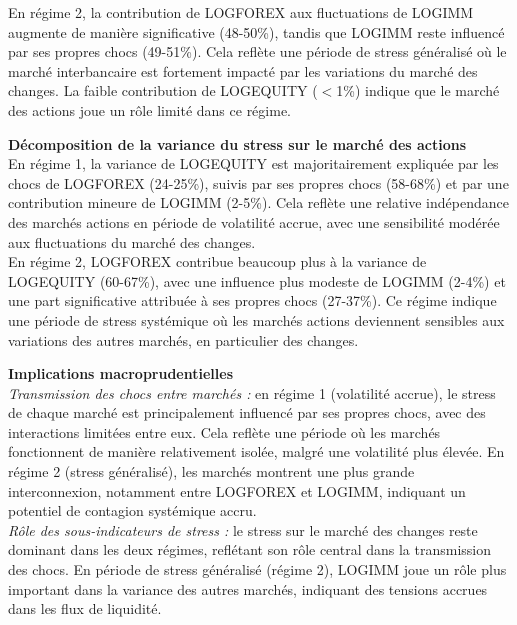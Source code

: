 En régime 2, la contribution de LOGFOREX aux fluctuations de LOGIMM augmente de manière significative (48-50\%), tandis que LOGIMM reste influencé par ses propres chocs (49-51\%). Cela reflète une période de stress généralisé où le marché interbancaire est fortement impacté par les variations du marché des changes. La faible contribution de LOGEQUITY ($<$1\%) indique que le marché des actions joue un rôle limité dans ce régime.

\vspace{0.5cm}

\textbf{Décomposition de la variance du stress sur le marché des actions} \\

En régime 1, la variance de LOGEQUITY est majoritairement expliquée par les chocs de LOGFOREX (24-25\%), suivis par ses propres chocs (58-68\%) et par une contribution mineure de LOGIMM (2-5\%). Cela reflète une relative indépendance des marchés actions en période de volatilité accrue, avec une sensibilité modérée aux fluctuations du marché des changes.\\

En régime 2, LOGFOREX contribue beaucoup plus à la variance de LOGEQUITY (60-67\%), avec une influence plus modeste de LOGIMM (2-4\%) et une part significative attribuée à ses propres chocs (27-37\%). Ce régime indique une période de stress systémique où les marchés actions deviennent sensibles aux variations des autres marchés, en particulier des changes.

\vspace{0.5cm}

\textbf{Implications macroprudentielles} \\

\textit{Transmission des chocs entre marchés :} en régime 1 (volatilité accrue), le stress de chaque marché est principalement influencé par ses propres chocs, avec des interactions limitées entre eux. Cela reflète une période où les marchés fonctionnent de manière relativement isolée, malgré une volatilité plus élevée. En régime 2 (stress généralisé), les marchés montrent une plus grande interconnexion, notamment entre LOGFOREX et LOGIMM, indiquant un potentiel de contagion systémique accru.\\

\textit{Rôle des sous-indicateurs de stress :} le stress sur le marché des changes reste dominant dans les deux régimes, reflétant son rôle central dans la transmission des chocs. En période de stress généralisé (régime 2), LOGIMM joue un rôle plus important dans la variance des autres marchés, indiquant des tensions accrues dans les flux de liquidité.\\

